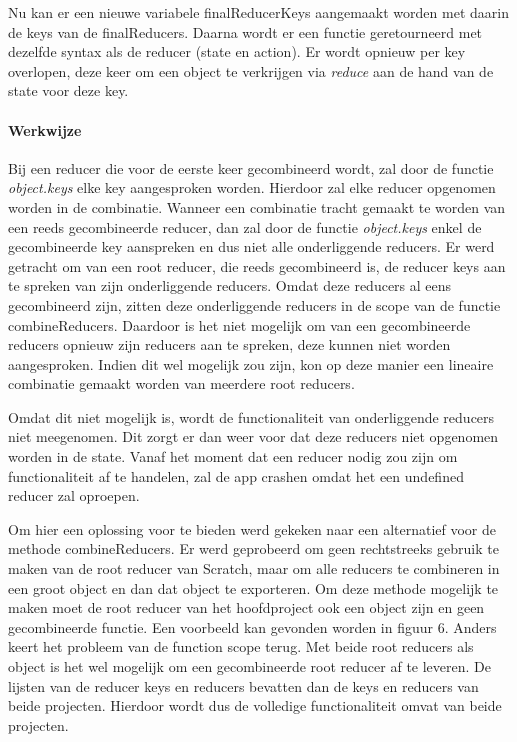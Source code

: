 Nu kan er een nieuwe variabele finalReducerKeys aangemaakt worden met daarin de keys van de finalReducers. Daarna wordt er een functie geretourneerd met dezelfde syntax als de reducer (state en action). Er wordt opnieuw per key overlopen, deze keer om een object te verkrijgen via \textit{reduce} aan de hand van de state voor deze key.

\paragraph{Werkwijze}

Bij een reducer die voor de eerste keer gecombineerd wordt, zal door de functie \textit{object.keys} elke key aangesproken worden. Hierdoor zal elke reducer opgenomen worden in de combinatie. Wanneer een combinatie tracht gemaakt te worden van een reeds gecombineerde reducer, dan zal door de functie \textit{object.keys} enkel de gecombineerde key aanspreken en dus niet alle onderliggende reducers. Er werd getracht om van een root reducer, die reeds gecombineerd is, de reducer keys aan te spreken van zijn onderliggende reducers. Omdat deze reducers al eens gecombineerd zijn, zitten deze onderliggende reducers in de scope van de functie combineReducers. Daardoor is het niet mogelijk om van een gecombineerde reducers opnieuw zijn reducers aan te spreken, deze kunnen niet worden aangesproken. Indien dit wel mogelijk zou zijn, kon op deze manier een lineaire combinatie gemaakt worden van meerdere root reducers. 

Omdat dit niet mogelijk is, wordt de functionaliteit van onderliggende reducers niet meegenomen. Dit zorgt er dan weer voor dat deze reducers niet opgenomen worden in de state. Vanaf het moment dat een reducer nodig zou zijn om functionaliteit af te handelen, zal de app crashen omdat het een undefined reducer zal oproepen. 

Om hier een oplossing voor te bieden werd gekeken naar een alternatief voor de methode combineReducers. 
Er werd geprobeerd om geen rechtstreeks gebruik te maken van de root reducer van Scratch, maar om alle reducers te combineren in een groot object en dan dat object te exporteren. Om deze methode mogelijk te maken moet de root reducer van het hoofdproject ook een object zijn en geen gecombineerde functie. Een voorbeeld kan gevonden worden in figuur 6. Anders keert het probleem van de function scope terug. Met beide root reducers als object is het wel mogelijk om een gecombineerde root reducer af te leveren. De lijsten van de reducer keys en reducers bevatten dan de keys en reducers van beide projecten. Hierdoor wordt dus de volledige functionaliteit omvat van beide projecten.
 
